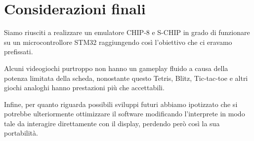 \documentclass[a4paper]{article}
\begin{document}
\section{Considerazioni finali}

Siamo riusciti a realizzare un emulatore CHIP-8 e S-CHIP in grado di funzionare su un
microcontrollore STM32 raggiungendo così l'obiettivo che ci eravamo prefissati.

Alcuni videogiochi purtroppo non hanno un gameplay fluido a causa della potenza
limitata della scheda, nonostante questo Tetris, Blitz, Tic-tac-toe e altri giochi
analoghi hanno prestazioni più che accettabili.

Infine, per quanto riguarda possibili sviluppi futuri abbiamo ipotizzato che si potrebbe
ulteriormente ottimizzare il software modificando l'interprete in modo tale da interagire
direttamente con il display, perdendo però così la sua portabilità.

%



\end{document}

